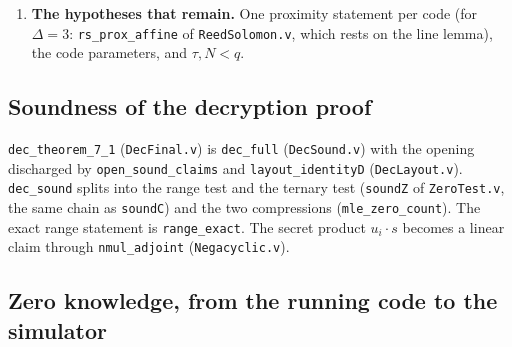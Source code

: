 \documentclass[11pt,a4paper]{article}
\theoremstyle{definition}
\theoremstyle{plain}
\begin{document}
\begin{enumerate}[leftmargin=1.6em,itemsep=2pt]
  (\texttt{SlotKinds.v}) with \texttt{open\_sound\_dec} (\texttt{OpenSoundDec.v}), which is \texttt{open\_sound}
  (\texttt{OpenSound.v} $\leftarrow$ \texttt{batch\_count}, \texttt{c\_count}, \texttt{opening\_values} of
  \texttt{Opening.v} and \texttt{mat\_bad\_queries} of \texttt{MatQueries.v}) with the decoder of
  \texttt{RsDecode.v} and the proximity hypotheses.
\item \textbf{The hypotheses that remain.} One proximity statement per code (for $\Delta=3$:
  \texttt{rs\_prox\_affine} of \texttt{ReedSolomon.v}, which rests on the line lemma), the code
  parameters, and $\tau,N<q$.
\end{enumerate}

\subsection{Soundness of the decryption proof}

\texttt{dec\_theorem\_7\_1} (\texttt{DecFinal.v}) is \texttt{dec\_full} (\texttt{DecSound.v}) with the opening
discharged by \texttt{open\_sound\_claims} and \texttt{layout\_identityD} (\texttt{DecLayout.v}).
\texttt{dec\_sound} splits into the range test and the ternary test (\texttt{soundZ} of \texttt{ZeroTest.v},
the same chain as \texttt{soundC}) and the two compressions (\texttt{mle\_zero\_count}). The exact range
statement is \texttt{range\_exact}. The secret product $u_i\cdot s$ becomes a linear claim through
\texttt{nmul\_adjoint} (\texttt{Negacyclic.v}).

\subsection{Zero knowledge, from the running code to the simulator}
\end{document}
